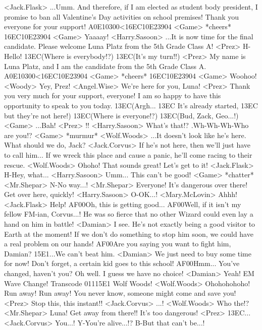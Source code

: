 <Jack.Flask> ...Umm. 
And therefore, if I am elected as student body president, I promise to ban 
all Valentine's Day activities on school premises! 
Thank you everyone for your support! 
{A0}{E1}{03}{00}<{16}{EC}{10}{E2}{39}{04} 
<Game> *cheers* 
{16}{EC}{10}{E2}{39}{04} 
<Game> Yaaaay! 
<Harry.Sasoon> ...It is now time for the final candidate. 
Please welcome Luna Platz from the 5th Grade Class A! 
<Prez> H-Hello! 
{13}{EC}(Where is everybody!?) 
{13}{EC}(It's my turn!!) 
<Prez> My name is Luna Platz, and I am the candidate from the 5th Grade Class A. 
{A0}{E1}{03}{00}<{16}{EC}{10}{E2}{39}{04} 
<Game> *cheers* 
{16}{EC}{10}{E2}{39}{04} 
<Game> Woohoo! 
<Woody> Yey, Prez! 
<Angel.Wise> We're here for you, Luna! 
<Prez> Thank you very much for your support, everyone! 
I am so happy to have this opportunity to speak to you today. 
{13}{EC}(Argh... {13}{EC} It's already started, {13}{EC} but they're not here!) 
{13}{EC}(Where is everyone!?) 
{13}{EC}(Bud, Zack, Geo...!) 
<Game> ...Bah! 
<Prez> !! 
<Harry.Sasoon> What's that!? 
.Wh-Wh-Wh-Who are you!? 
<Game> *murmur* 
<Wolf.Woods> ...It doesn't look like he's here. 
What should we do, Jack? 
<Jack.Corvus> If he's not here, then we'll just have to call him... 
If we wreck this place and cause a panic, he'll come racing to their rescue. 
<Wolf.Woods> Ohoho! That sounds great! 
Let's get to it! 
<Jack.Flask> H-Hey, what... 
<Harry.Sasoon> Umm... This can't be good! 
<Game> *chatter* 
<Mr.Shepar> N-No way...! 
<Mr.Shepar> Everyone! It's dangerous over there! 
Get over here, quickly! 
<Harry.Sasoon> O-OK...! 
<Mary.McLovin> Ahhh! 
<Jack.Flask> Help! 
{AF}{00}Oh, this is getting good... 
{AF}{00}Well, if it isn't my fellow FM-ian, Corvus...! 
He was so fierce that no other Wizard could even lay a hand on him in battle! 
<Damian> I see. 
He's not exactly being a good visitor to Earth at the moment! 
If we don't do something to stop him soon, we could have a real problem on our hands! 
{AF}{00}Are you saying you want to fight him, Damian? 
{15}{E1}...We can't beat him. 
<Damian> We just need to buy some time for now! 
Don't forget, a certain kid goes to this school! 
{AF}{00}Hmm... You've changed, haven't you? 
Oh well. I guess we have no choice! 
<Damian> Yeah! 
EM Wave Change! Transcode 011{15}{E1} Wolf Woods! 
<Wolf.Woods> Ohohohohoho! Run away! Run away! 
You never know, someone might come and save you! 
<Prez> Stop this, this instant!! 
<Jack.Corvus> ...! 
<Wolf.Woods> Who the!? 
<Mr.Shepar> Luna! Get away from there!! It's too dangerous! 
<Prez> {13}{EC}... 
<Jack.Corvus> You...! 
Y-You're alive...!? 
B-But that can't be...! 
